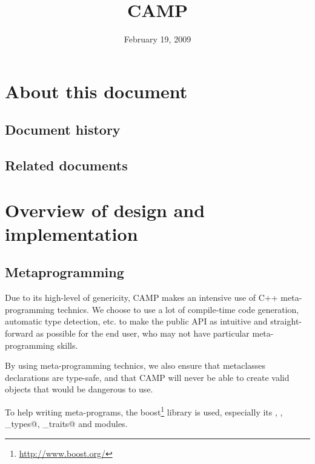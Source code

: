 \documentclass[a4paper, twoside]{report}
\title{CAMP}
\date{February 19, 2009}
\begin{document}
\maketitle

\chapter*{About this document}

\section*{Document history}

\begin{historytable}
\end{historytable}

\section*{Related documents}

\begin{documenttable}
\end{documenttable}

\tableofcontents

\chapter{Overview of design and implementation}

\section{Metaprogramming}

	Due to its high-level of genericity, CAMP makes an intensive use of C++ meta-programming technics.
	We choose to use a lot of compile-time code generation, automatic type detection, etc. to
	make the public API as intuitive and straight-forward as possible for the end user, who
	may not have particular meta-programming skills.
	
	By using meta-programming technics, we also ensure that metaclasses declarations are
	type-safe, and that CAMP will never be able to create valid objects that would be dangerous to use.
	
	To help writing meta-programs, the boost\footnote{\url{http://www.boost.org/}} library is used,
	especially its \verb@function@, \verb@bind@, \verb@function_types@, \verb@type_traits@
	and \verb@variant@ modules.
	
\end{document}
